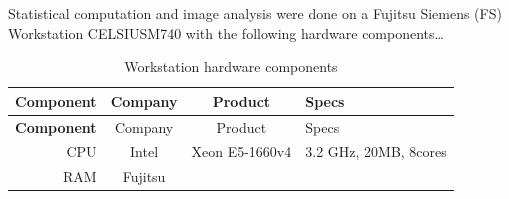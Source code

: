 \documentclass[11pt,singlespacinge,twoside]{reedthesis} %
\begin{document}
Statistical computation and image analysis were done on a Fujitsu Siemens (FS) Workstation CELSIUSM740 with the following hardware components\ldots{}
\begin{longtable}[]{@{}rccl@{}}
\caption{\label{tab:PCcomp} Workstation hardware components}\tabularnewline
\toprule
\begin{minipage}[b]{0.19\columnwidth}\raggedleft
\textbf{Component}\strut
\end{minipage} & \begin{minipage}[b]{0.20\columnwidth}\centering
Company\strut
\end{minipage} & \begin{minipage}[b]{0.22\columnwidth}\centering
Product\strut
\end{minipage} & \begin{minipage}[b]{0.28\columnwidth}\raggedright
Specs\strut
\end{minipage}\tabularnewline
\midrule
\endfirsthead
\toprule
\begin{minipage}[b]{0.19\columnwidth}\raggedleft
\textbf{Component}\strut
\end{minipage} & \begin{minipage}[b]{0.20\columnwidth}\centering
Company\strut
\end{minipage} & \begin{minipage}[b]{0.22\columnwidth}\centering
Product\strut
\end{minipage} & \begin{minipage}[b]{0.28\columnwidth}\raggedright
Specs\strut
\end{minipage}\tabularnewline
\midrule
\endhead
\begin{minipage}[t]{0.19\columnwidth}\raggedleft
CPU\strut
\end{minipage} & \begin{minipage}[t]{0.20\columnwidth}\centering
Intel\strut
\end{minipage} & \begin{minipage}[t]{0.22\columnwidth}\centering
Xeon E5-1660v4\strut
\end{minipage} & \begin{minipage}[t]{0.28\columnwidth}\raggedright
3.2 GHz, 20MB, 8cores\strut
\end{minipage}\tabularnewline
\begin{minipage}[t]{0.19\columnwidth}\raggedleft
RAM\strut
\end{minipage} & \begin{minipage}[t]{0.20\columnwidth}\centering
Fujitsu\strut

\end{minipage}
\end{longtable}
\end{document}
